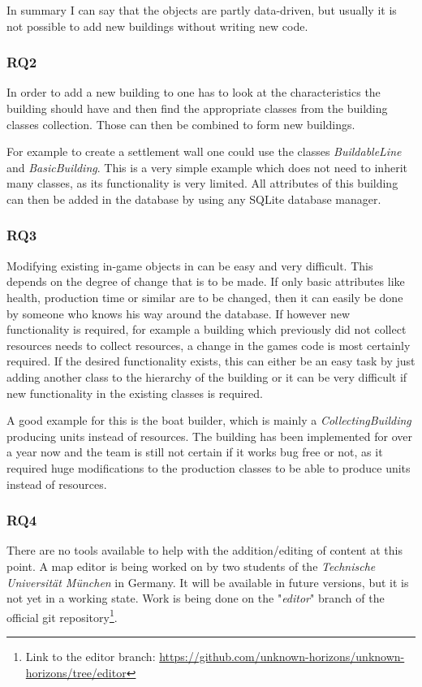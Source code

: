 In summary I can say that the objects are partly data-driven, but usually it is not possible to add new buildings
without writing new code.

\subsubsection{RQ2}
In order to add a new building to \UH{} one has to look at the characteristics the building should have and
then find the appropriate classes from the \UH{} building classes collection. Those can then be combined to
form new buildings.

For example to create a settlement wall one could use the classes \textit{BuildableLine} and
\textit{BasicBuilding}. This is a very simple example which does not need to inherit many classes, as its functionality
is very limited. All attributes of this building can then be added in the database by using any SQLite database manager.

\subsubsection{RQ3}
Modifying existing in-game objects in \UH{} can be easy and very difficult. This depends on the degree of
change that is to be made. If only basic attributes like health, production time or similar are to be changed, then it
can easily be done by someone who knows his way around the database. If however new functionality is required, for
example a building which previously did not collect resources needs to collect resources, a change in the games code is
most certainly required. If the desired functionality exists, this can either be an easy task by just adding another class to
the hierarchy of the building or it can be very difficult if new functionality in the existing classes is required.

A good example for this is the boat builder, which is mainly a \textit{CollectingBuilding} producing units instead of
resources. The building has been implemented for over a year now and the team is still not certain if it works bug free
or not, as it required huge modifications to the production classes to be able to produce units instead of resources.

\subsubsection{RQ4}
There are no tools available to help with the addition/editing of content at this point. A map editor is being worked on
by two students of the \textit{Technische Universität München} in Germany. It will be available in future versions, but
it is not yet in a working state. Work is being done on the "\textit{editor}" branch of the official \UH{} git
repository\footnote{Link to the editor branch: \url{https://github.com/unknown-horizons/unknown-horizons/tree/editor}}.

